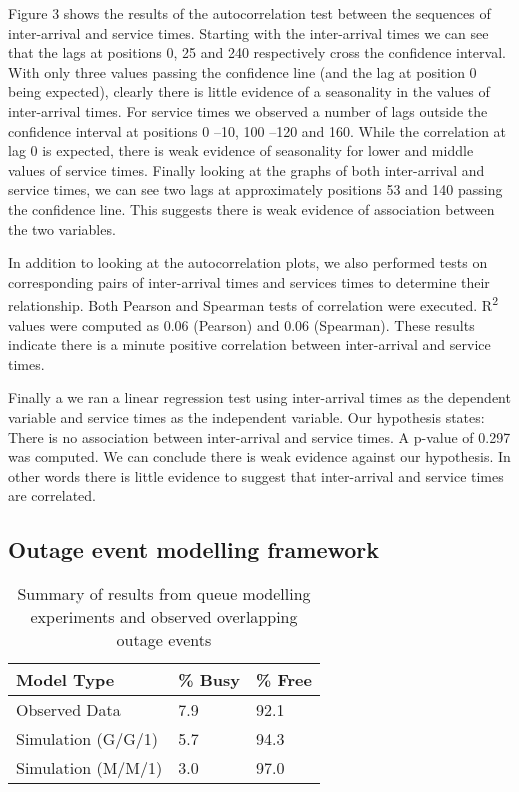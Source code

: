 \documentclass[5p]{elsarticle}
\begin{document}
Figure 3 shows the results of the autocorrelation test between the sequences of inter-arrival and service times. Starting with the inter-arrival times we can see that the lags at positions 0, 25 and 240 respectively cross the confidence interval. With only three values passing the confidence line (and the lag at position 0 being expected), clearly there is little evidence of a seasonality in the values of inter-arrival times. For service times we observed a number of lags outside the confidence interval at positions 0 --10, 100 --120 and 160. While the correlation at lag 0 is expected, there is weak evidence of seasonality for lower and middle values of service times. Finally looking at the graphs of both inter-arrival and service times, we can see two lags at approximately positions 53 and 140 passing the confidence line. This suggests there is weak evidence of association between the two variables.

In addition to looking at the autocorrelation plots, we also performed tests on corresponding pairs of inter-arrival times and services times to determine their relationship. Both Pearson and Spearman tests of correlation were executed. R\textsuperscript{2} values were computed as 0.06 (Pearson) and 0.06 (Spearman). These results indicate there is a minute positive correlation between inter-arrival and service times.

Finally a we ran a linear regression test using inter-arrival times as the dependent variable and service times as the independent variable. Our hypothesis states: There is no association between inter-arrival and service times. A p-value of 0.297 was computed. We can conclude there is weak evidence against our hypothesis. In other words there is little evidence to suggest that inter-arrival and service times are correlated. 

\subsection{Outage event modelling framework}

\begin {table}[]
\caption {Summary of results from queue modelling experiments and observed overlapping outage events} 
\begin{center}
\begin{tabular}{l | l | l} \bf{Model Type} & \bf {\% Busy} & \bf {\% Free}
\\ \hline Observed Data & 7.9 &  92.1 
\\  Simulation (G/G/1) & 5.7 &  94.3 
\\  Simulation (M/M/1) & 3.0  &  97.0 
\\ \hline 
 \end{tabular}
\end{center}
\end{table}
\end{document}
